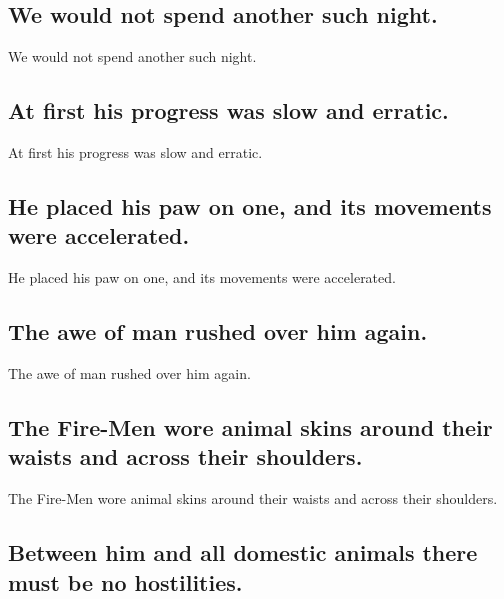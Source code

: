 \documentclass[]{article}
\begin{document}
\hypertarget{we-would-not-spend-another-such-night.}{%
\subsection{We would not spend another such
night.}\label{we-would-not-spend-another-such-night.}}

We would not spend another such night.

\hypertarget{at-first-his-progress-was-slow-and-erratic.}{%
\subsection{At first his progress was slow and
erratic.}\label{at-first-his-progress-was-slow-and-erratic.}}

At first his progress was slow and erratic.

\hypertarget{he-placed-his-paw-on-one-and-its-movements-were-accelerated.}{%
\subsection{He placed his paw on one, and its movements were
accelerated.}\label{he-placed-his-paw-on-one-and-its-movements-were-accelerated.}}

He placed his paw on one, and its movements were accelerated.

\hypertarget{the-awe-of-man-rushed-over-him-again.}{%
\subsection{The awe of man rushed over him
again.}\label{the-awe-of-man-rushed-over-him-again.}}

The awe of man rushed over him again.

\hypertarget{the-fire-men-wore-animal-skins-around-their-waists-and-across-their-shoulders.}{%
\subsection{The Fire-Men wore animal skins around their waists and
across their
shoulders.}\label{the-fire-men-wore-animal-skins-around-their-waists-and-across-their-shoulders.}}

The Fire-Men wore animal skins around their waists and across their
shoulders.

\hypertarget{between-him-and-all-domestic-animals-there-must-be-no-hostilities.}{%
\subsection{Between him and all domestic animals there must be no
hostilities.}\label{between-him-and-all-domestic-animals-there-must-be-no-hostilities.}}
\end{document}
